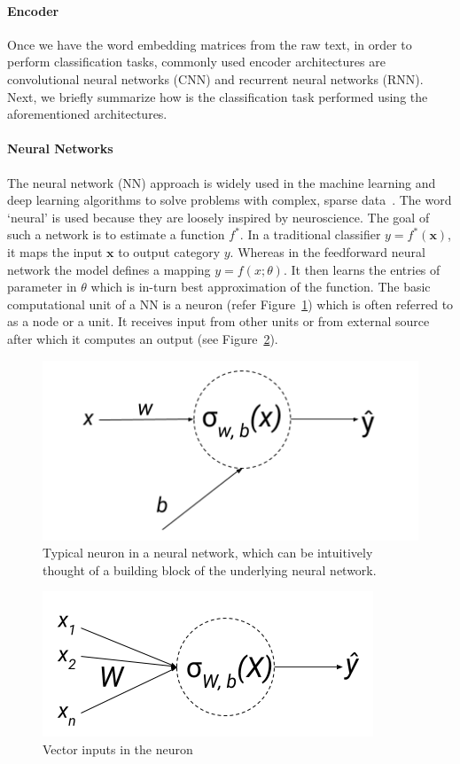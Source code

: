 \paragraph{Encoder} Once we have the word embedding matrices from the raw text, in order to perform classification tasks, commonly used encoder architectures are convolutional neural networks (CNN) and recurrent neural networks (RNN). Next, we briefly summarize how is the classification task performed using the aforementioned architectures.

\paragraph{Neural Networks}
The neural network (NN) approach is widely used in the machine learning and deep learning algorithms to solve problems with complex, sparse data~\cite{lecun2015deep}. The word `neural' is used because they are loosely inspired by neuroscience. 
The goal of such a network is to estimate a function $f^*$.  In a traditional classifier $ y = f^*(\textbf{x})$, it maps the input $\textbf{x}$ to output category $y$. Whereas in the feedforward neural network the model defines a mapping $ y = f(x;\theta)$. It then learns the entries of parameter in $\theta$ which is in-turn best approximation of the function. 
The basic computational unit of a NN is a neuron (refer Figure~\ref{fig:neuron}) which is often referred to as a node or a unit. It receives input from other units or from external source after which it computes an output (see Figure~\ref{fig:vectorinputs}).
\begin{figure}[!htb]
    \centering
    \includegraphics[scale=0.6]{Figures/neuron.png}
    \caption{Typical neuron in a neural network, which can be intuitively thought of a building block of the underlying neural network.}
    \label{fig:neuron}
\end{figure}
\begin{figure}[!htb]
    \centering
    \includegraphics[scale=0.6]{Figures/Vector-Inputs-to-Neuron.png}
    \caption{Vector inputs in the neuron}
    \label{fig:vectorinputs}
\end{figure}
